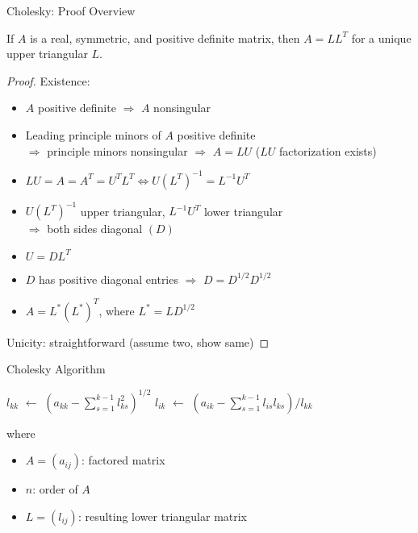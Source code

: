 \documentclass[9pt, serif]{beamer}
\newlength{\wideitemsep}
\let\olditem\item
\renewcommand{\item}{\setlength{\itemsep}{\wideitemsep}\olditem}
\newcommand{\bi}{\begin{itemize}}
\newcommand{\ei}{\end{itemize}}
\newcommand*\Let[2]{\State #1 $\gets$ #2}
\begin{document}
\begin{frame}{Cholesky: Proof Overview}
\begin{theorem}
	If $A$ is a real, symmetric, and positive definite matrix, then $A=LL^T$ for a unique upper triangular $L$. \pause
\end{theorem}
\begin{proof}
    Existence: \pause
    \bi 
    	\item $A$ positive definite $\Rightarrow$ $A$ nonsingular \pause 
		\item Leading principle minors of $A$ positive definite \\$\Rightarrow$ principle minors nonsingular $\Rightarrow$ $A=LU$ ($LU$ factorization exists) \pause
		\item $LU = A = A^T = U^TL^T \Leftrightarrow U(L^T)^{-1} = L^{-1}U^T$ \pause
		\item $U(L^T)^{-1}$ upper triangular, $L^{-1}U^T$ lower triangular \\$\Rightarrow$ both sides diagonal $(D)$ \pause
        \item $U=DL^T$ \pause
	    \item $D$ has positive diagonal entries $\Rightarrow$ $D = D^{1/2}D^{1/2}$ \pause
		\item $A = L^*(L^*)^T$, where $L^* = LD^{1/2}$
    \ei \pause
    Unicity: straightforward (assume two, show same)
\end{proof}
\end{frame}


\begin{frame}{Cholesky Algorithm}
 \begin{algorithmic}[1]
                \Let{$l_{kk}$}{$\left(a_{kk}-\sum\limits_{s=1}^{k-1}l_{ks}^2\right)^{1/2}$}
                    \Let{$l_{ik}$}{$\left(a_{ik}-\sum\limits_{s=1}^{k-1}l_{is}l_{ks}\right)/l_{kk}$}
                \EndFor
            \EndFor
            \vspace{-5mm}
            \State {}
        \EndFunction
    \end{algorithmic}
    \vspace{2mm}
    where
    \vspace{2mm}
    \bi
        \item $A = (a_{ij})$: factored matrix
        \item $n$: order of $A$
        \item $L = (l_{ij})$: resulting lower triangular matrix
    \ei
\end{frame}
\end{document}
